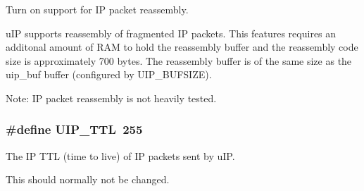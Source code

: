 Turn on support for IP packet reassembly. 

u\-IP supports reassembly of fragmented IP packets. This features requires an additonal amount of RAM to hold the reassembly buffer and the reassembly code size is approximately 700 bytes. The reassembly buffer is of the same size as the uip\_\-buf buffer (configured by UIP\_\-BUFSIZE).

\begin{Desc}
\item[Note:]IP packet reassembly is not heavily tested. \end{Desc}
\hypertarget{a00072_gb61381673de27f31848c5396bf0b338e}{
\subsubsection[UIP\_\-TTL]{\setlength{\rightskip}{0pt plus 5cm}\#define UIP\_\-TTL~255}}
\label{a00072_gb61381673de27f31848c5396bf0b338e}


The IP TTL (time to live) of IP packets sent by u\-IP. 

This should normally not be changed. 